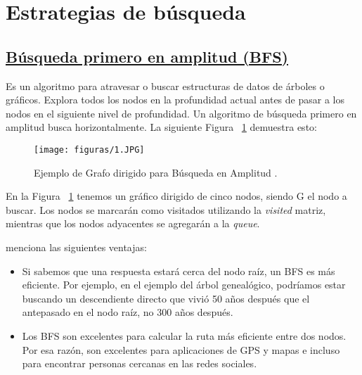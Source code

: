 \documentclass[10pt,conference]{IEEEtran}
\begin{document}
\section{\textbf{Estrategias de búsqueda}} 

\subsection{\underline{\textbf{Búsqueda primero en amplitud (BFS)}}}
Es un algoritmo para atravesar o buscar estructuras de datos de árboles o gráficos. Explora todos los nodos en la profundidad actual antes de pasar a los nodos en el siguiente nivel de profundidad. \citep{amplitud}
Un algoritmo de búsqueda primero en amplitud busca horizontalmente. La siguiente Figura ~\ref{f1} demuestra esto:

\begin{figure}[H]
 \begin{center}
       \texttt{[image: figuras/1.JPG]}
      \caption{Ejemplo de Grafo dirigido para Búsqueda en Amplitud .}
      \label{f1} 
      \end{center}
\end{figure}

En la Figura ~\ref{f1} tenemos un gráfico dirigido de cinco nodos, siendo G el nodo a buscar. Los nodos se marcarán como visitados utilizando la \textit{visited} matriz, mientras que los nodos adyacentes se agregarán a la \textit{queue}.

\citep{ventajasamplitud} menciona las siguientes ventajas:
\begin{itemize}
    \item Si sabemos que una respuesta estará cerca del nodo raíz, un BFS es más eficiente. Por ejemplo, en el ejemplo del árbol genealógico, podríamos estar buscando un descendiente directo que vivió 50 años después que el antepasado en el nodo raíz, no 300 años después.
    \item Los BFS son excelentes para calcular la ruta más eficiente entre dos nodos. Por esa razón, son excelentes para aplicaciones de GPS y mapas e incluso para encontrar personas cercanas en las redes sociales.
\end{itemize}
\end{document}
